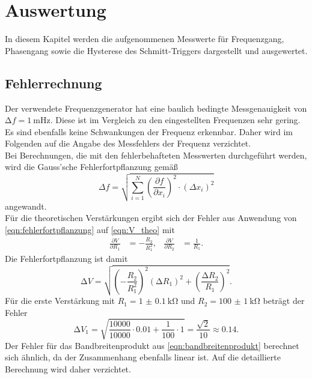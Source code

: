 \section{Auswertung}
\label{sec:Auswertung}
In diesem Kapitel werden die aufgenommenen Messwerte für Frequenzgang, Phasengang sowie die Hysterese des Schmitt-Triggers dargestellt und ausgewertet.
\subsection{Fehlerrechnung}
\label{sec:fehlerrechnung}
Der verwendete Frequenzgenerator hat eine baulich bedingte Messgenauigkeit von $\increment f = \qty{1}{\milli\hertz}$.
Diese ist im Vergleich zu den eingestellten Frequenzen sehr gering. Es sind ebenfalls keine Schwankungen der Frequenz erkennbar.
Daher wird im Folgenden auf die Angabe des Messfehlers der Frequenz verzichtet.\\
Bei Berechnungen, die mit den fehlerbehafteten Messwerten durchgeführt werden, wird die Gauss'sche Fehlerfortpflanzung gemäß
\begin{equation}
\Delta f = \sqrt{\sum_{i=1}^{N} {\left( \frac{\partial f}{\partial x_i} \right)}^2 \cdot {(\Delta x_i)}^2}
\label{eqn:fehlerfortpflanzung}
\end{equation}
angewandt.\\
Für die theoretischen Verstärkungen ergibt sich der Fehler aus Anwendung von \autoref{eqn:fehlerfortpflanzung} auf \autoref{eqn:V_theo} mit
\begin{align*}
  \frac{\partial V}{\partial R_1} &= -\frac{R_2}{R_1^2}, & \frac{\partial V}{\partial R_2} &= \frac{1}{R_1}.
\end{align*}
Die Fehlerfortpflanzung ist damit
\begin{equation*}
  \increment V = \sqrt{{\left(-\frac{R_2}{R_1^2}\right)}^2{(\increment R_1)}^2 + {\left(\frac{\increment R_2}{R_1}\right)}^2}.
\end{equation*}
Für die erste Verstärkung mit $R_1 = \qty{1(0.1)}{\kilo\ohm}$ und $R_2=\qty{100(1)}{\kilo\ohm}$ beträgt der Fehler
\begin{equation*}
  \increment V_1 = \sqrt{\frac{10000}{10000}\cdot 0.01 + \frac{1}{100}\cdot 1} = \frac{\sqrt{2}}{10} \approx 0.14.
\end{equation*}
Der Fehler für das Bandbreitenprodukt aus \autoref{eqn:bandbreitenprodukt} berechnet sich ähnlich, da der Zusammenhang ebenfalls linear ist.
Auf die detaillierte Berechnung wird daher verzichtet.\\\\
